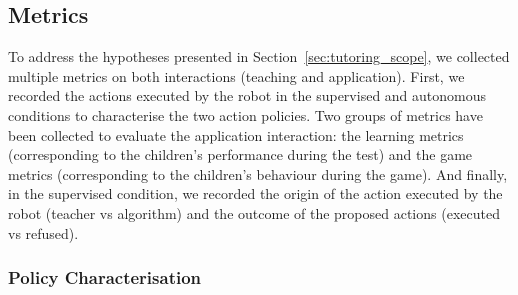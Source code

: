 
\subsection{Metrics}


To address the hypotheses presented in Section~\ref{sec:tutoring_scope}, we collected multiple metrics on both interactions (teaching and application). First, we recorded the actions executed by the robot in the supervised and autonomous conditions to characterise the two action policies. Two groups of metrics have been collected to evaluate the application interaction: the learning metrics (corresponding to the children's performance during the test) and the game metrics (corresponding to the children's behaviour during the game). And finally, in the supervised condition, we recorded the origin of the action executed by the robot (teacher vs algorithm) and the outcome of the proposed actions (executed vs refused).

\subsubsection{Policy Characterisation}

